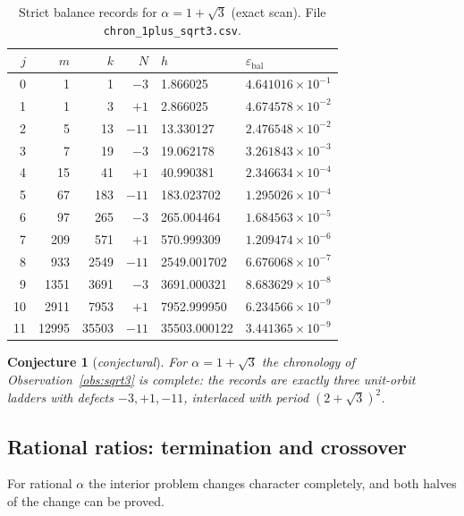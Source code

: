 \documentclass[11pt]{article}
\newtheorem{conjecture}[theorem]{Conjecture}
\theoremstyle{definition}
\theoremstyle{remark}
\newcommand{\eb}{\varepsilon_{\mathrm{bal}}}
\begin{document}
\begin{table}[ht]
\centering
\small
\begin{tabular}{rrrrll}
\hline
$j$ & $m$ & $k$ & $N$ & $h$ & $\eb$ \\
\hline
0 & 1 & 1 & $-3$ & 1.866025 & $4.641016\times10^{-1}$\\
1 & 1 & 3 & $+1$ & 2.866025 & $4.674578\times10^{-2}$\\
2 & 5 & 13 & $-11$ & 13.330127 & $2.476548\times10^{-2}$\\
3 & 7 & 19 & $-3$ & 19.062178 & $3.261843\times10^{-3}$\\
4 & 15 & 41 & $+1$ & 40.990381 & $2.346634\times10^{-4}$\\
5 & 67 & 183 & $-11$ & 183.023702 & $1.295026\times10^{-4}$\\
6 & 97 & 265 & $-3$ & 265.004464 & $1.684563\times10^{-5}$\\
7 & 209 & 571 & $+1$ & 570.999309 & $1.209474\times10^{-6}$\\
8 & 933 & 2549 & $-11$ & 2549.001702 & $6.676068\times10^{-7}$\\
9 & 1351 & 3691 & $-3$ & 3691.000321 & $8.683629\times10^{-8}$\\
10 & 2911 & 7953 & $+1$ & 7952.999950 & $6.234566\times10^{-9}$\\
11 & 12995 & 35503 & $-11$ & 35503.000122 & $3.441365\times10^{-9}$\\
\hline
\end{tabular}
\caption{Strict balance records for $\alpha=1+\sqrt3$ (exact scan). File \texttt{chron\_1plus\_sqrt3.csv}.}
\label{tab:onesqrt3}
\end{table}

\begin{conjecture}[\emph{conjectural}]\label{conj:sqrt3}
For $\alpha=1+\sqrt3$ the chronology of Observation~\ref{obs:sqrt3} is complete: the records are exactly three unit-orbit ladders with defects $-3,+1,-11$, interlaced with period $(2+\sqrt3)^2$.
\end{conjecture}

\subsection{Rational ratios: termination and crossover}\label{sec:rational}

For rational $\alpha$ the interior problem changes character completely, and both halves of the change can be proved.
\end{document}
